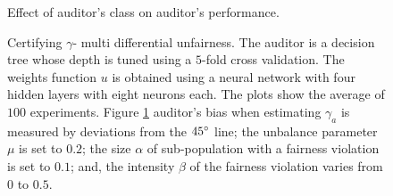 \documentclass{article}
\begin{document}
\begin{figure}[h!]
	\begin{subfigure} {.475\linewidth}
		\centering
	\end{subfigure}
	\caption{Effect of auditor's class on auditor's performance.}
	\label{fig: 2a}
	\caption{Certifying $\gamma$- multi differential unfairness. The auditor is a decision tree whose depth is tuned using a $5$-fold cross validation.  The weights function $u$ is obtained using a neural network with four hidden layers with eight neurons each. The plots show the average of $100$ experiments. Figure \ref{fig: 2a} auditor's bias when estimating $\gamma_{a}$ is measured by deviations from the $45\degree$ line; the unbalance parameter $\mu$ is set to $0.2$; the size $\alpha$ of sub-population with a fairness violation is set to $0.1$; and, the intensity $\beta$ of the fairness violation varies from $0$ to $0.5$.  }  
\end{figure}
\end{document}
